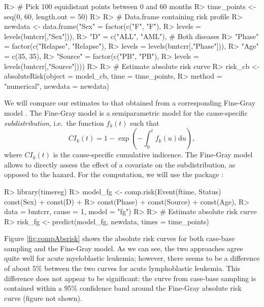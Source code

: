 \documentclass[
]{jss}
\begin{document}
\begin{CodeChunk}

\begin{CodeInput}
R> # Pick 100 equidistant points between 0 and 60 months
R> time_points <- seq(0, 60, length.out = 50)
R> 
R> # Data.frame containing risk profile
R> newdata <- data.frame("Sex" = factor(c("F", "F"), 
R>                                      levels = levels(bmtcrr[,"Sex"])),
R>                       "D" = c("ALL", "AML"), # Both diseases
R>                       "Phase" = factor(c("Relapse", "Relapse"), 
R>                                        levels = levels(bmtcrr[,"Phase"])),
R>                       "Age" = c(35, 35),
R>                       "Source" = factor(c("PB", "PB"), 
R>                                         levels = levels(bmtcrr[,"Source"])))
R> 
R> # Estimate absolute risk curve
R> risk_cb <- absoluteRisk(object = model_cb, time = time_points,
R>                         method = "numerical", newdata = newdata)
\end{CodeInput}
\end{CodeChunk}

We will compare our estimates to that obtained from a corresponding
Fine-Gray model \citeyearpar{fine1999proportional}. The Fine-Gray model
is a semiparametric model for the cause-specific \emph{subdistribution},
i.e.~the function \(f_k(t)\) such that
\[CI_k(t) =1 - \exp\left( - \int_0^t f_k(u) \textrm{d}u \right),\] where
\(CI_k(t)\) is the cause-specific cumulative indicence. The Fine-Gray
model allows to directly assess the effect of a covariate on the
subdistribution, as opposed to the hazard. For the computation, we will
use the  package \citep{timereg}:

\begin{CodeChunk}

\begin{CodeInput}
R> library(timereg)
R> model_fg <- comp.risk(Event(ftime, Status) ~ const(Sex) + const(D) + 
R>                           const(Phase) + const(Source) + const(Age), 
R>                       data = bmtcrr, cause = 1, model = "fg")
R> 
R> # Estimate absolute risk curve
R> risk_fg <- predict(model_fg, newdata, times = time_points)
\end{CodeInput}
\end{CodeChunk}

Figure \ref{fig:compAbsrisk} shows the absolute risk curves for both
case-base sampling and the Fine-Gray model. As we can see, the two
approaches agree quite well for acute myeloblastic leukemia; however,
there seems to be a difference of about 5\% between the two curves for
acute lymphoblastic leukemia. This difference does not appear to be
significant: the curve from case-base sampling is contained within a
95\% confidence band around the Fine-Gray absolute risk curve (figure
not shown).
\end{document}
